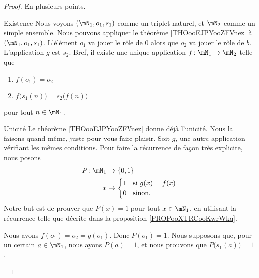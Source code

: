\begin{proof}
    En plusieurs points.
    \begin{subproof}
    \item[Existence]
        Nous voyons \( (\mN_1, o_1, s_1)\) comme un triplet naturel, et \( \mN_2\) comme un simple ensemble. Nous pouvons appliquer le théorème \ref{THOooEJPYooZFVnez} à \( (\mN_1, o_1, s_1)\). L'élément \( o_1\) va jouer le rôle de \( 0\) alors que \( o_2\) va jouer le rôle de \( b\). L'application \( g\) est \( s_2\). Bref, il existe une unique application \( f\colon \mN_1\to \mN_2\) telle que
        \begin{enumerate}
            \item
                $f(o_1)=o_2$ 
            \item
                \( f\big( s_1(n) \big)=s_2\big( f(n) \big)\)
        \end{enumerate}
        pour tout \( n\in \mN_1\).
    \item[Unicité]
        Le théorème \ref{THOooEJPYooZFVnez} donne déjà l'unicité. Nous la faisons quand même, juste pour vous faire plaisir. Soit \( g\), une autre application vérifiant les mêmes conditions. Pour faire la récurrence de façon très explicite, nous posons
        \begin{equation}
            \begin{aligned}
                P\colon \mN_1&\to \{ 0,1 \} \\
                x&\mapsto \begin{cases}
                    1    &   \text{si } g(x)=f(x)\\
                    0    &    \text{sinon. }
                \end{cases}
            \end{aligned}
        \end{equation}
        Notre but est de prouver que \( P(x)=1\) pour tout \( x\in \mN_1\), en utilisant la récurrence telle que décrite dans la proposition \ref{PROPooXTRCooKwrWkq}.

        Nous avons \( f(o_1)=o_2=g(o_1)\). Donc \( P(o_1)=1\). Nous supposons que, pour un certain \( a\in \mN_1\), nous ayons \( P(a)=1\), et nous prouvons que \( P\big( s_1(a) \big)=1\).


\end{subproof}
\end{proof}
